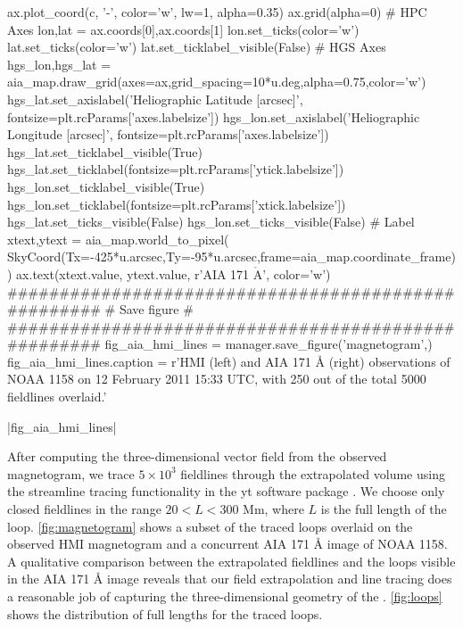 \begin{pycode}[manager]
    ax.plot_coord(c, '-', color='w', lw=1, alpha=0.35)
ax.grid(alpha=0)
# HPC Axes
lon,lat = ax.coords[0],ax.coords[1]
lon.set_ticks(color='w')
lat.set_ticks(color='w')
lat.set_ticklabel_visible(False)
# HGS Axes
hgs_lon,hgs_lat = aia_map.draw_grid(axes=ax,grid_spacing=10*u.deg,alpha=0.75,color='w')
hgs_lat.set_axislabel('Heliographic Latitude [arcsec]',
                      fontsize=plt.rcParams['axes.labelsize'])
hgs_lon.set_axislabel('Heliographic Longitude [arcsec]',
                      fontsize=plt.rcParams['axes.labelsize'])
hgs_lat.set_ticklabel_visible(True)
hgs_lat.set_ticklabel(fontsize=plt.rcParams['ytick.labelsize'])
hgs_lon.set_ticklabel_visible(True)
hgs_lon.set_ticklabel(fontsize=plt.rcParams['xtick.labelsize'])
hgs_lat.set_ticks_visible(False)
hgs_lon.set_ticks_visible(False)
# Label
xtext,ytext = aia_map.world_to_pixel(
    SkyCoord(Tx=-425*u.arcsec,Ty=-95*u.arcsec,frame=aia_map.coordinate_frame))
ax.text(xtext.value, ytext.value, r'AIA 171 $\mathrm{\mathring{A}}$', color='w')
####################################################
#                  Save figure                     #
####################################################
fig_aia_hmi_lines = manager.save_figure('magnetogram',)
fig_aia_hmi_lines.caption = r'HMI (left) and AIA 171 \AA{} (right) observations of \AR{} NOAA 1158 on 12 February 2011 15:33 UTC, with 250 out of the total 5000 fieldlines overlaid.'
\end{pycode}
\py[manager]|fig_aia_hmi_lines|

After computing the three-dimensional vector field from the observed magnetogram, we trace $5\times10^3$ fieldlines through the extrapolated volume using the streamline tracing functionality in the yt software package \citep{turk_yt_2011}. We choose only closed fieldlines in the range $20<L<300$ Mm, where $L$ is the full length of the loop. \autoref{fig:magnetogram} shows a subset of the traced loops overlaid on the observed HMI magnetogram and a concurrent AIA 171 \AA{} image of NOAA 1158. A qualitative comparison between the extrapolated fieldlines and the loops visible in the AIA 171 \AA{} image reveals that our field extrapolation and line tracing does a reasonable job of capturing the three-dimensional geometry of the \AR{}. \autoref{fig:loops} shows the distribution of full lengths for the traced loops.


